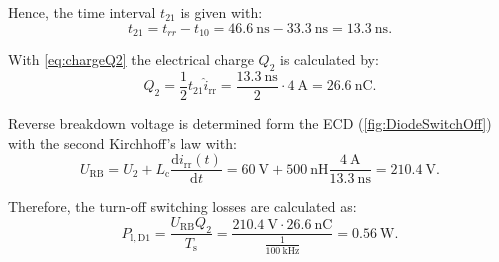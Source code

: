 \begin{solutionblock}
    Hence, the time interval $t_{21}$ is given with:
    \begin{equation}
        t_{21} = t_{rr} - t_{10} = \SI{46.6}{\nano\second} - \SI{33.3}{\nano\second} = \SI{13.3}{\nano\second}.
    \end{equation}

    With \eqref{eq:chargeQ2} the electrical charge $Q_2$ is calculated by:
    \begin{equation}
        Q_2 = \frac{1}{2} t_{21} \hat{i}_{\mathrm{rr}} = \frac{\SI{13.3}{\nano\second}}{2} \cdot \SI{4}{\ampere} = \SI{26.6}{\nano\coulomb}.
    \end{equation}

    Reverse breakdown voltage is determined form the ECD (\autoref{fig:DiodeSwitchOff}) with the second Kirchhoff's law with:
    \begin{equation}
        U_{\mathrm{RB}} = U_2 + L_{\mathrm{c}} \frac{\mathrm{d}i_{\mathrm{rr}}(t)}{\mathrm{d}t} = \SI{60}{\volt} + \SI{500}{\nano\henry} \frac{\SI{4}{\ampere}}{\SI{13.3}{\nano\second}} = \SI{210.4}{\volt}.
        \label{eq:reverseBreakdownVoltage}
    \end{equation}

    Therefore, the turn-off switching losses are calculated as:
    \begin{equation}
        P_{\mathrm{l,D1}} = \frac{U_{\mathrm{RB}}Q_2}{T_{\mathrm{s}}} = \frac{\SI{210.4}{\volt}\cdot \SI{26.6}{\nano\coulomb}}{\frac{1}{\SI{100}{\kilo\hertz}}} = \SI{0.56}{\watt}.
    \end{equation}

\end{solutionblock}




